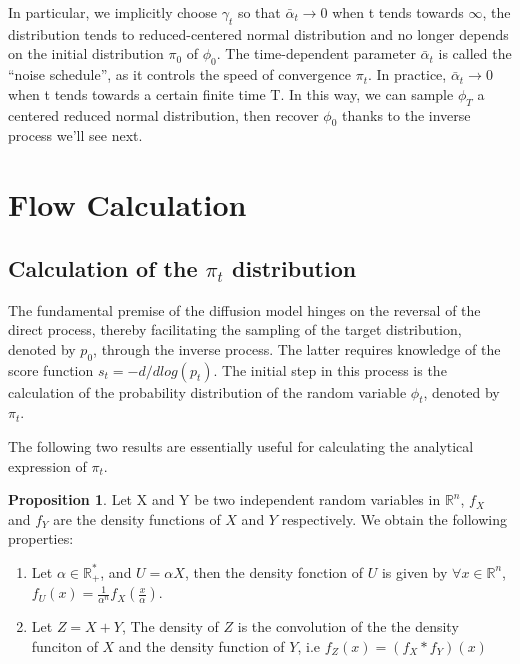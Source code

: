 \documentclass[a4paper,10pt]{article}
\theoremstyle{definition} %
\theoremstyle{definition} %
\newtheorem{proposition}[definition]{Proposition}
\theoremstyle{definition} %
\theoremstyle{definition} %
\newcommand{\R}{\mathbb{R}}
\begin{document}
In particular, we implicitly choose $\gamma_t$ so that $\bar \alpha_t \rightarrow 0$ when t tends towards $\infty$, the distribution tends to reduced-centered normal distribution and no longer depends on the initial  distribution $\pi_0$ of $\phi_0$. The time-dependent parameter $\bar \alpha_t$ is called the “noise schedule”, as it controls the speed of convergence $\pi_t$. In practice, $\bar \alpha_t \rightarrow 0$ when t tends towards a certain finite time T. In this way, we can sample $\phi_T$ a centered reduced normal distribution, then recover $\phi_0$ thanks to the inverse process we'll see next.
\section{Flow Calculation} \label{sec:calcul_numerique}
\subsection{Calculation of the $\pi_t$ distribution}

The fundamental premise of the diffusion model hinges on the reversal of the direct process, thereby facilitating the sampling of the target distribution, denoted by $p_0$, through the inverse process. The latter requires knowledge of the score function $s_t = -d/dlog(p_t)$. The initial step in this process is the calculation of the probability distribution of the random variable $\phi_t$, denoted by $\pi_t$.

The following two results are essentially useful for calculating the analytical expression of $\pi_t$.
\begin{proposition}\label{prop:quelques_resultats_sur_la_densite}
    Let X and Y be two independent random variables in $\R^n$, $f_X$ and $f_Y$ are the density functions of $X$ and $Y$ respectively. We obtain the following properties:
    \vspace{-10pt}
\begin{enumerate}[label=(\roman*)]
    \item Let $\alpha \in \R_+^*$, and $U = \alpha X$, then the density fonction of $U$ is given by $\forall x\in \R^n$, $f_U(x) = \frac{1}{\alpha^n} f_X(\frac{x}{\alpha})$.
    \item Let $Z = X+Y$, The density of $Z$ is the convolution of the the density funciton of $X$ and the density function of $Y$, i.e $f_Z(x) = (f_X * f_Y)(x)$
\end{enumerate}
\end{proposition}
\end{document}
